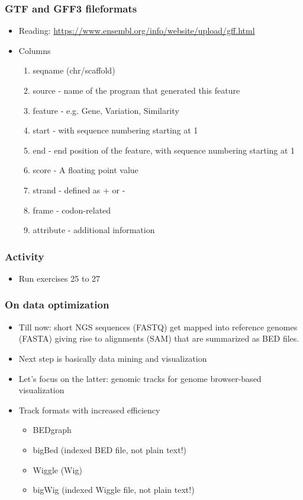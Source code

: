 \documentclass{beamer}
\begin{document}
\begin{frame}
  \frametitle{GTF and GFF3 fileformats}
  \begin{itemize}
  \item Reading: \url{https://www.ensembl.org/info/website/upload/gff.html}
  \item Columns
    \begin{enumerate}
    \item seqname (chr/scaffold)
    \item source - name of the program that generated this feature
    \item feature -  e.g. Gene, Variation, Similarity
    \item start - with sequence numbering starting at 1
    \item end - end position of the feature, with sequence numbering starting at 1
    \item score - A floating point value
    \item strand - defined as + or -
    \item frame - codon-related
    \item attribute - additional information
    \end{enumerate}
  \end{itemize}
\end{frame}


\begin{frame}
  \frametitle{Activity}
  \begin{itemize}
  \item Run exercises 25 to 27
  \end{itemize}
\end{frame}




\begin{frame}
  \frametitle{On data optimization}
  \begin{itemize}
  \item Till now: short NGS sequences (FASTQ) get mapped into reference genomes (FASTA) giving rise to alignments (SAM) that are summarized as BED files.
  \item Next step is basically data mining and visualization
  \item Let's focus on the latter: genomic tracks for genome browser-based visualization
  \item Track formats with increased efficiency
    \begin{itemize}
    \item BEDgraph
    \item bigBed (indexed BED file, not plain text!)
    \item Wiggle (Wig)
    \item bigWig (indexed Wiggle file, not plain text!)
    \end{itemize}
  \end{itemize}
\end{frame}
\end{document}

